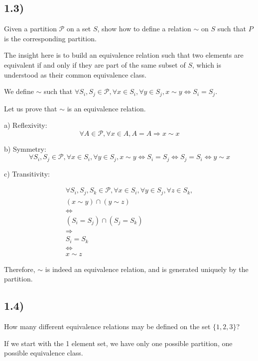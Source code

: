 \documentclass[12pt, letterpaper, twoside]{report}
\begin{document}
\subsection*{1.3)}

Given a partition $\mathcal{P}$ on a set $S$, show how to define a relation $\sim$ on $S$ such that $P$ is the corresponding partition.

The insight here is to build an equivalence relation such that two elements are equivalent if and only if they are part of the same subset of $S$, which is understood as their common equivalence class.

We define $\sim$ such that $\forall S_i, S_j \in \mathcal{P}, \forall x \in S_i, \forall y \in S_j, x \sim y \Leftrightarrow S_i = S_j$.

Let us prove that $\sim$ is an equivalence relation.

a) Reflexivity:
$$\forall A \in \mathcal{P}, \forall x \in A, A = A \Rightarrow x \sim x$$

b) Symmetry:
$$\forall S_i, S_j \in \mathcal{P}, \forall x \in S_i, \forall y \in S_j, x \sim y \Leftrightarrow S_i = S_j \Leftrightarrow S_j = S_i \Leftrightarrow y \sim x$$

c) Transitivity:

$$
\begin{aligned}
\forall S_i, S_j, S_k \in \mathcal{P}, \forall x \in S_i, \forall y \in S_j, \forall z \in S_k, \\
(x \sim y) \cap (y \sim z) \\
	\Leftrightarrow \\
(S_i = S_j) \cap (S_j = S_k) \\
	\Rightarrow \\
S_i = S_k \\
	\Leftrightarrow \\
x \sim z
\end{aligned}
$$

Therefore, $\sim$ is indeed an equivalence relation, and is generated uniquely by the partition.



\subsection*{1.4)}

How many different equivalence relations may be defined on the set $\{1, 2, 3\}$?

If we start with the 1 element set, we have only one possible partition, one possible equivalence class.
\end{document}
